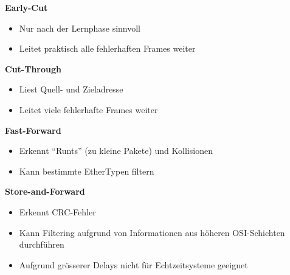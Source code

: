 \begin{minipage}[t]{.45\linewidth}
	\textbf{Early-Cut}
	\begin{itemize}
		\item Nur nach der Lernphase sinnvoll
		\item Leitet praktisch alle fehlerhaften Frames weiter
	\end{itemize}
\end{minipage}
\hspace{.1\linewidth}
\begin{minipage}[t]{.45\linewidth}
	\textbf{Cut-Through}
	\begin{itemize}
		\item Liest Quell- und Zieladresse
		\item Leitet viele fehlerhafte Frames weiter
	\end{itemize}
\end{minipage}

\begin{minipage}[t]{.45\linewidth}
	\textbf{Fast-Forward}
	\begin{itemize}
		\item Erkennt ``Runts'' (zu kleine Pakete) und Kollisionen
		\item Kann bestimmte EtherTypen filtern
	\end{itemize}
\end{minipage}
\hspace{.1\linewidth}
\begin{minipage}[t]{.45\linewidth}
	\textbf{Store-and-Forward}
	\begin{itemize}
		\item Erkennt CRC-Fehler
		\item Kann Filtering aufgrund von Informationen aus höheren OSI-Schichten
			durchführen
		\item Aufgrund grösserer Delays nicht für Echtzeitsysteme geeignet
	\end{itemize}
\end{minipage}
